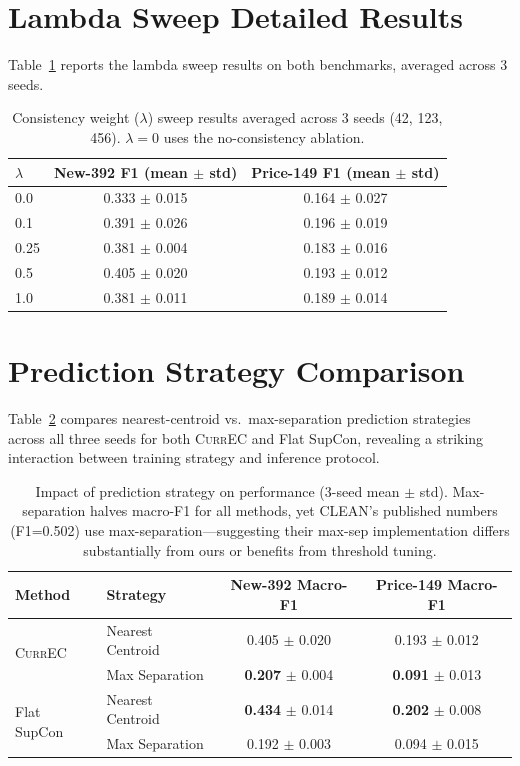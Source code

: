 \documentclass{article}
\newcommand{\currec}{\textsc{CurrEC}}
\begin{document}
\section{Lambda Sweep Detailed Results}\label{app:lambda}

Table~\ref{tab:lambda_detail} reports the lambda sweep results on both benchmarks, averaged across 3 seeds.

\begin{table}[h]
\caption{Consistency weight ($\lambda$) sweep results averaged across 3 seeds (42, 123, 456). $\lambda = 0$ uses the no-consistency ablation.}
\label{tab:lambda_detail}
\centering
\begin{tabular}{lcc}
\toprule
$\lambda$ & New-392 F1 (mean $\pm$ std) & Price-149 F1 (mean $\pm$ std) \\
\midrule
0.0 & 0.333 $\pm$ 0.015 & 0.164 $\pm$ 0.027 \\
0.1 & 0.391 $\pm$ 0.026 & 0.196 $\pm$ 0.019 \\
0.25 & 0.381 $\pm$ 0.004 & 0.183 $\pm$ 0.016 \\
0.5 & 0.405 $\pm$ 0.020 & 0.193 $\pm$ 0.012 \\
1.0 & 0.381 $\pm$ 0.011 & 0.189 $\pm$ 0.014 \\
\bottomrule
\end{tabular}
\end{table}

\section{Prediction Strategy Comparison}\label{app:strategy}

Table~\ref{tab:strategy} compares nearest-centroid vs.\ max-separation prediction strategies across all three seeds for both \currec{} and Flat SupCon, revealing a striking interaction between training strategy and inference protocol.

\begin{table}[h]
\caption{Impact of prediction strategy on performance (3-seed mean $\pm$ std). Max-separation halves macro-F1 for all methods, yet CLEAN's published numbers (F1=0.502) use max-separation---suggesting their max-sep implementation differs substantially from ours or benefits from threshold tuning.}
\label{tab:strategy}
\centering
\small
\begin{tabular}{llcc}
\toprule
Method & Strategy & New-392 Macro-F1 & Price-149 Macro-F1 \\
\midrule
\multirow{2}{*}{\currec{}} & Nearest Centroid & 0.405 $\pm$ 0.020 & 0.193 $\pm$ 0.012 \\
 & Max Separation & \textbf{0.207} $\pm$ 0.004 & \textbf{0.091} $\pm$ 0.013 \\
\midrule
\multirow{2}{*}{Flat SupCon} & Nearest Centroid & \textbf{0.434} $\pm$ 0.014 & \textbf{0.202} $\pm$ 0.008 \\
 & Max Separation & 0.192 $\pm$ 0.003 & 0.094 $\pm$ 0.015 \\
\bottomrule
\end{tabular}
\end{table}
\end{document}
